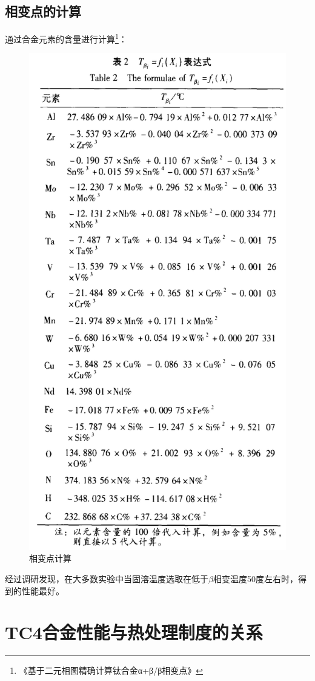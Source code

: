 \documentclass[
class = book,
zihao = -4,
font = noto,
paper = a4paper,
openany
]{easybook}
\begin{document}
\subsection{相变点的计算}
通过合金元素的含量进行计算\footnote{《基于二元相图精确计算钛合金α+β/β相变点》}：
\begin{figure}[h!]
	\centering
	\includegraphics[width=0.8\linewidth]{相变点计算}
	\caption{相变点计算}
	\label{fig:keypoint}
\end{figure}



经过调研发现，在大多数实验中当固溶温度选取在低于$ \beta $相变温度50度左右时，得到的性能最好。
\section{TC4合金性能与热处理制度的关系}
\end{document}

